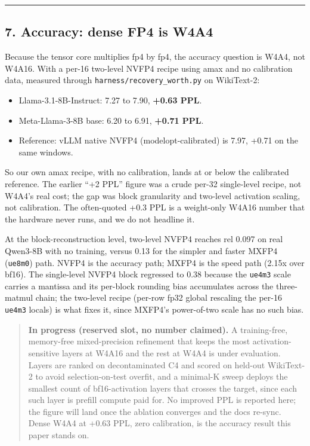 \documentclass[
]{article}
\providecommand{\tightlist}{%
  \setlength{\itemsep}{0pt}\setlength{\parskip}{0pt}}
\begin{document}
\begin{center}\rule{0.5\linewidth}{0.5pt}\end{center}

\subsection{7. Accuracy: dense FP4 is
W4A4}\label{accuracy-dense-fp4-is-w4a4}

Because the tensor core multiplies fp4 by fp4, the accuracy question is
W4A4, not W4A16. With a per-16 two-level NVFP4 recipe using amax and no
calibration data, measured through \texttt{harness/recovery\_worth.py}
on WikiText-2:

\begin{itemize}
\tightlist
\item
  Llama-3.1-8B-Instruct: 7.27 to 7.90, \textbf{+0.63 PPL}.
\item
  Meta-Llama-3-8B base: 6.20 to 6.91, \textbf{+0.71 PPL}.
\item
  Reference: vLLM native NVFP4 (modelopt-calibrated) is 7.97, +0.71 on
  the same windows.
\end{itemize}

So our own amax recipe, with no calibration, lands at or below the
calibrated reference. The earlier ``+2 PPL'' figure was a crude per-32
single-level recipe, not W4A4's real cost; the gap was block granularity
and two-level activation scaling, not calibration. The often-quoted +0.3
PPL is a weight-only W4A16 number that the hardware never runs, and we
do not headline it.

At the block-reconstruction level, two-level NVFP4 reaches rel 0.097 on
real Qwen3-8B with no training, versus 0.13 for the simpler and faster
MXFP4 (\texttt{ue8m0}) path. NVFP4 is the accuracy path; MXFP4 is the
speed path (2.15x over bf16). The single-level NVFP4 block regressed to
0.38 because the \texttt{ue4m3} scale carries a mantissa and its
per-block rounding bias accumulates across the three-matmul chain; the
two-level recipe (per-row fp32 global rescaling the per-16
\texttt{ue4m3} locals) is what fixes it, since MXFP4's power-of-two
scale has no such bias.

\begin{quote}
\textbf{In progress (reserved slot, no number claimed).} A
training-free, memory-free mixed-precision refinement that keeps the
most activation-sensitive layers at W4A16 and the rest at W4A4 is under
evaluation. Layers are ranked on decontaminated C4 and scored on
held-out WikiText-2 to avoid selection-on-test overfit, and a minimal-K
sweep deploys the smallest count of bf16-activation layers that crosses
the target, since each such layer is prefill compute paid for. No
improved PPL is reported here; the figure will land once the ablation
converges and the docs re-sync. Dense W4A4 at +0.63 PPL, zero
calibration, is the accuracy result this paper stands on.
\end{quote}
\end{document}
